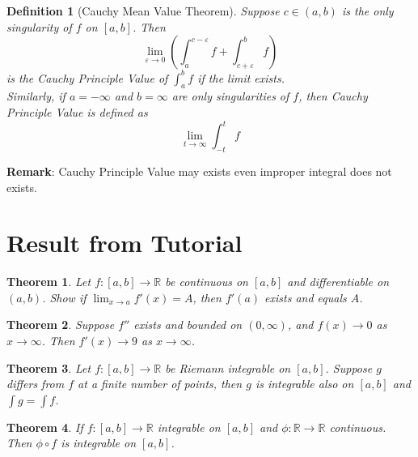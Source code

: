 \documentclass[12pt]{article}
\newtheorem{definition}{Definition}[section]
\newtheorem{theorem}{Theorem}[section]
\theoremstyle{definition}
\begin{document}
\begin{definition}[Cauchy Mean Value Theorem]
\normalfont Suppose $c\in(a,b)$ is the only singularity of $f$ on $[a,b]$. Then
\[
\lim_{\varepsilon\to 0}(\int_a^{c-\varepsilon}f+\int_{c+\varepsilon}^b f)
\]
is the Cauchy Principle Value of $\int_a^b f$ if the limit exists.\\
Similarly, if $a=-\infty$ and $b=\infty$ are only singularities of $f$, then Cauchy Principle Value is defined as
\[
\lim_{t\to\infty}\int_{-t}^t f
\]
\end{definition}
\textbf{Remark}: Cauchy Principle Value may exists even improper integral does not exists.
\section{Result from Tutorial}
\begin{theorem}\normalfont Let $f:[a,b]\to\mathbb{R}$ be continuous on $[a,b]$ and differentiable on $(a,b)$. Show if $\lim_{x\to a}f'(x)=A$, then $f'(a)$ exists and equals $A$.
\end{theorem}
\begin{theorem}\normalfont Suppose $f''$ exists and bounded on $(0,\infty)$, and $f(x)\to 0$ as $x\to \infty$. Then $f'(x)\to 9$ as $x\to\infty$.\end{theorem}
\begin{theorem}\normalfont Let $f:[a,b]\to\mathbb{R}$ be Riemann integrable on $[a,b]$. Suppose $g$ differs from $f$ at a finite number of points, then $g$ is integrable also on $[a,b]$ and $\int g = \int f$.
\end{theorem}
\begin{theorem}\normalfont If $f:[a,b]\to\mathbb{R}$ integrable on $[a,b]$ and $\phi:\mathbb{R}\to\mathbb{R}$ continuous. Then $\phi\circ f$ is integrable on $[a,b]$.
\end{theorem}
\end{document}
